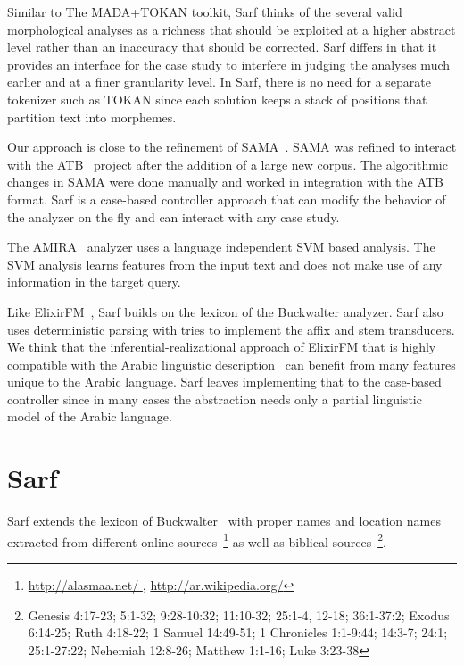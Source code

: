 \documentclass[11pt]{article}
\begin{document}
Similar to The MADA+TOKAN toolkit, Sarf thinks of
the several valid morphological analyses as a richness that 
should be exploited at a higher abstract level rather than
an inaccuracy that should be corrected. 
Sarf differs in that it provides an interface for the 
case study to interfere in judging the analyses much earlier and
at a finer granularity level. 
In Sarf, there is no need for a separate tokenizer such as
TOKAN since each solution keeps a stack of positions
that partition text into morphemes.


Our approach is close to the refinement of SAMA~\cite{Maamouri:10}.
SAMA was refined to interact with
the ATB~\cite{Maamouri:04} project after the addition of a large 
new corpus. 
The algorithmic changes in SAMA were
done manually and worked in integration with the ATB format. 
Sarf is a case-based controller approach that can modify 
the behavior of the analyzer on the fly and can interact
with any case study. 

The AMIRA~\cite{Diab:07} analyzer uses 
a language independent SVM based analysis. 
The SVM analysis learns features from the input text 
and does not make use of any information 
in the target query.

Like ElixirFM~\cite{Otakar:07}, Sarf builds on the lexicon
of the Buckwalter analyzer. 
Sarf also uses deterministic parsing with tries 
to implement the affix and stem transducers. 
We think that the inferential-realizational approach 
of ElixirFM
that is highly compatible with the Arabic linguistic 
description~\cite{Badawi:04}
can benefit from many features unique to the Arabic language.
Sarf leaves implementing that to the case-based controller
since in many cases the abstraction needs only a partial 
linguistic model of the Arabic language. 


\section{Sarf}
\label{sec:sarf}

Sarf extends the lexicon of Buckwalter~ with
proper names and location names extracted from different online 
sources~\footnote{\href{http://alasmaa.net/}{http://alasmaa.net/ }, 
\href{http://ar.wikipedia.org/}{http://ar.wikipedia.org/}}
as well as biblical sources~\footnote{Genesis 4:17-23; 5:1-32; 9:28-10:32; 11:10-32; 25:1-4, 12-18; 36:1-37:2; Exodus 6:14-25; Ruth 4:18-22; 1 Samuel 14:49-51; 1 Chronicles 1:1-9:44; 14:3-7; 24:1; 25:1-27:22; Nehemiah 12:8-26; Matthew 1:1-16; Luke 3:23-38}.
\end{document}
